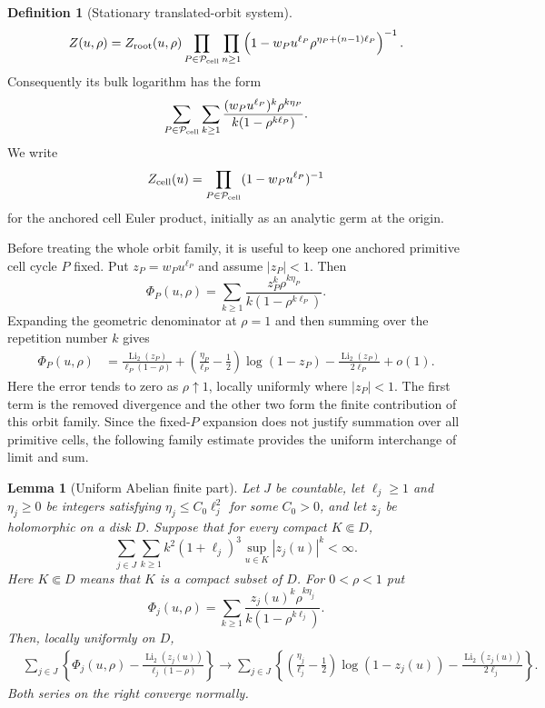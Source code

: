 \documentclass[11pt,reqno]{amsart}
\numberwithin{equation}{section}
\newtheorem{lemma}[theorem]{Lemma}
\theoremstyle{definition}
\newtheorem{definition}[theorem]{Definition}
\theoremstyle{remark}
\newcommand{\Li}{\operatorname{Li}_2}
\begin{document}
\begin{definition}[Stationary translated-orbit system]
\begin{equation}
 Z(u,\rho)=Z_{\rm root}(u,\rho)
 \prod_{P\in\mathcal P_{\rm cell}}\prod_{n\ge1}
 \left(1-w_Pu^{\ell_P}
 \rho^{\eta_P+(n-1)\ell_P}\right)^{-1}.
\end{equation}
Consequently its bulk logarithm has the form
\begin{equation}\label{eq:abstract-bulk-log}
 \sum_{P\in\mathcal P_{\rm cell}}\sum_{k\ge1}
 \frac{(w_Pu^{\ell_P})^k\rho^{k\eta_P}}
 {k(1-\rho^{k\ell_P})}.
\end{equation}
We write
\begin{equation}\label{eq:abstract-cell-zeta}
 Z_{\rm cell}(u)=
 \prod_{P\in\mathcal P_{\rm cell}}(1-w_Pu^{\ell_P})^{-1}
\end{equation}
for the anchored cell Euler product, initially as an analytic germ at the
origin.
\end{definition}

Before treating the whole orbit family, it is useful to keep one anchored
primitive cell cycle $P$ fixed.  Put $z_P=w_Pu^{\ell_P}$ and assume
$|z_P|<1$.  Then
\[
 \Phi_P(u,\rho)=\sum_{k\ge1}
 \frac{z_P^k\rho^{k\eta_P}}{k(1-\rho^{k\ell_P})}.
\]
Expanding the geometric denominator at $\rho=1$ and then summing over the
repetition number $k$ gives
\begin{align}\label{eq:one-orbit-warmup}
 \Phi_P(u,\rho)
 &=\frac{\Li(z_P)}{\ell_P(1-\rho)}
 +\left(\frac{\eta_P}{\ell_P}-\frac12\right)\log(1-z_P)
-\frac{\Li(z_P)}{2\ell_P}+o(1).
\end{align}
Here the error tends to zero as $\rho\uparrow1$, locally uniformly where
$|z_P|<1$.
The first term is the removed divergence and the other two form the finite
contribution of this orbit family.  Since the fixed-$P$ expansion does not
justify summation over all primitive cells, the following family estimate
provides the uniform interchange of limit and sum.

\begin{lemma}[Uniform Abelian finite part]\label{lem:uniform-abel}
Let $J$ be countable, let $\ell_j\ge1$ and $\eta_j\ge0$ be integers satisfying
$\eta_j\le C_0\ell_j^2$ for some $C_0>0$, and let $z_j$ be holomorphic on a
disk $D$.  Suppose
that for every compact $K\Subset D$,
\begin{equation}\label{eq:abel-summability}
 \sum_{j\in J}\sum_{k\ge1}
 k^2(1+\ell_j)^3\sup_{u\in K}|z_j(u)|^k<\infty.
\end{equation}
Here $K\Subset D$ means that $K$ is a compact subset of $D$.
For $0<\rho<1$ put
\[
 \Phi_j(u,\rho)=\sum_{k\ge1}
 \frac{z_j(u)^k\rho^{k\eta_j}}{k(1-\rho^{k\ell_j})}.
\]
Then, locally uniformly on $D$,
\begin{align}
 &\sum_{j\in J}\left\{
 \Phi_j(u,\rho)-
 \frac{\Li(z_j(u))}{\ell_j(1-\rho)}\right\}
 \longrightarrow \sum_{j\in J}\left\{
 \left(\frac{\eta_j}{\ell_j}-\frac12\right)
 \log(1-z_j(u))
 -\frac{\Li(z_j(u))}{2\ell_j}\right\}.
 \label{eq:abel-family-limit}
\end{align}
Both series on the right converge normally.
\end{lemma}
\end{document}
